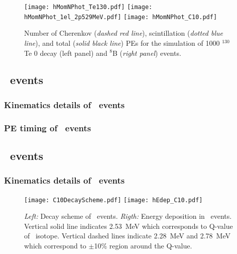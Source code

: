 \begin{figure*}[ht]
  \centering
  \texttt{[image: hMomNPhot\_Te130.pdf]}
  \texttt{[image: hMomNPhot\_1el\_2p529MeV.pdf]}
  \texttt{[image: hMomNPhot\_C10.pdf]}
  \caption{Number of Cherenkov (\emph{dashed red line}), scintillation
    (\emph{dotted blue line}), and total (\emph{solid black line}) PEs
    for the simulation of 1000 $^{130}$Te 0{\nbb} decay (left panel)
    and $^8$B (\emph{right panel}) events.}
\label{fig:NPhotDist}
\end{figure*}






\subsection{\B~events}
\subsubsection{Kinematics details of \B~events}
\subsubsection{PE timing of \B~events}












\subsection{\C~events}
\subsubsection{Kinematics details of \C~events}

\begin{figure}[ht]
  \centering
  \texttt{[image: C10DecayScheme.pdf]}
  \texttt{[image: hEdep\_C10.pdf]}
  \caption{\emph{Left:} Decay scheme of \C~events. \emph{Rigth:} Energy deposition in \C~events. Vertical solid line indicates 2.53~MeV
    which corresponds to Q-value of \Te~isotope. Vertical dashed lines indicate 2.28~MeV and 2.78~MeV which correspond to $\pm$10\% region 
    around the Q-value.}
\label{fig:C10_scheme_and_edep}
\end{figure}

